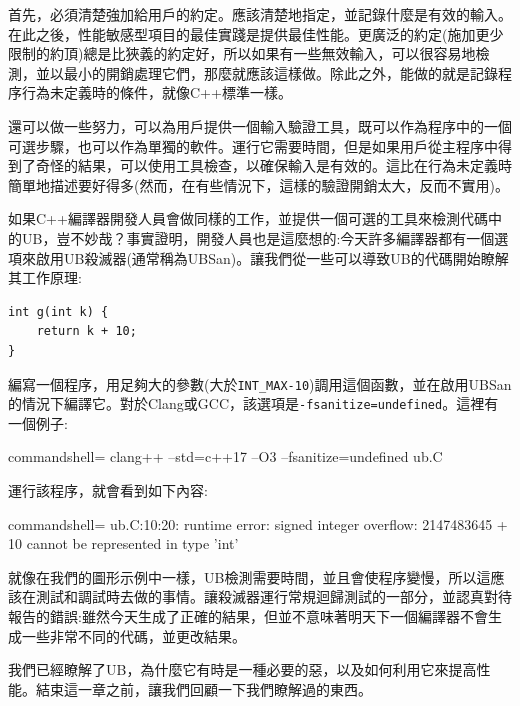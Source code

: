 首先，必須清楚強加給用戶的約定。應該清楚地指定，並記錄什麼是有效的輸入。在此之後，性能敏感型項目的最佳實踐是提供最佳性能。更廣泛的約定(施加更少限制的約頂)總是比狹義的約定好，所以如果有一些無效輸入，可以很容易地檢測，並以最小的開銷處理它們，那麼就應該這樣做。除此之外，能做的就是記錄程序行為未定義時的條件，就像C++標準一樣。 

還可以做一些努力，可以為用戶提供一個輸入驗證工具，既可以作為程序中的一個可選步驟，也可以作為單獨的軟件。運行它需要時間，但是如果用戶從主程序中得到了奇怪的結果，可以使用工具檢查，以確保輸入是有效的。這比在行為未定義時簡單地描述要好得多(然而，在有些情況下，這樣的驗證開銷太大，反而不實用)。

如果C++編譯器開發人員會做同樣的工作，並提供一個可選的工具來檢測代碼中的UB，豈不妙哉？事實證明，開發人員也是這麼想的:今天許多編譯器都有一個選項來啟用UB殺滅器(通常稱為UBSan)。讓我們從一些可以導致UB的代碼開始瞭解其工作原理:

\begin{lstlisting}[style=styleCXX]
int g(int k) {
	return k + 10;
}

\end{lstlisting}

編寫一個程序，用足夠大的參數(大於\texttt{INT\_MAX-10})調用這個函數，並在啟用UBSan的情況下編譯它。對於Clang或GCC，該選項是\texttt{-fsanitize=undefined}。這裡有一個例子:

\begin{tcblisting}{commandshell={}}
clang++ --std=c++17 –O3 –fsanitize=undefined ub.C
\end{tcblisting}

運行該程序，就會看到如下內容:

\begin{tcblisting}{commandshell={}}
ub.C:10:20: runtime error: signed integer overflow: 
        2147483645 + 10 cannot be represented in type 'int'
\end{tcblisting}

就像在我們的圖形示例中一樣，UB檢測需要時間，並且會使程序變慢，所以這應該在測試和調試時去做的事情。讓殺滅器運行常規迴歸測試的一部分，並認真對待報告的錯誤:雖然今天生成了正確的結果，但並不意味著明天下一個編譯器不會生成一些非常不同的代碼，並更改結果。

我們已經瞭解了UB，為什麼它有時是一種必要的惡，以及如何利用它來提高性能。結束這一章之前，讓我們回顧一下我們瞭解過的東西。

























